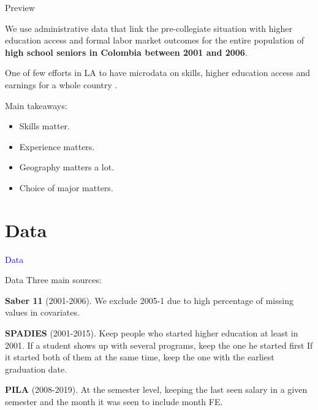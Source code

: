 \documentclass[11pt, aspectratio=169]{beamer}
\newenvironment{transitionframe}{
  \setbeamercolor{background canvas}{bg=gray}
  \begin{frame}}{
    \end{frame}
}
\newenvironment{wideitemize}{\itemize\addtolength{\itemsep}{10pt}}{\enditemize}
\begin{document}
\begin{frame}{Preview}
    \begin{wideitemize}
        \item We use administrative data that link the pre-collegiate situation with higher education access and formal labor market outcomes for the entire population of \textbf{high school seniors in Colombia between 2001 and 2006}.
        \item One of few efforts in LA to have microdata on skills, higher education access and earnings for a whole country \citep{gomez2022returns,herrera2020economic,ferreyra2022labor}.
        \item Main takeaways:
        \begin{itemize}
            \item Skills matter.
            \item Experience matters.
            \item Geography matters a lot.
            \item Choice of major matters. 
        \end{itemize}
    \end{wideitemize}

\end{frame}


\section{Data}

\begin{transitionframe}
  \begin{center}
    { \huge \textcolor{blue}{Data}}
  \end{center}
\end{transitionframe}

\begin{frame}{Data}
    Three main sources:
    \vspace{0.2cm}
    \begin{wideitemize}
        \item \textbf{Saber 11} (2001-2006). We exclude 2005-1 due to high percentage of missing values in covariates.
        \item \textbf{SPADIES} (2001-2015). Keep people who started higher education at least in 2001. If a student shows up with several programs, keep the one he started first If it started both of them at the same time, keep the one with the earliest graduation date.
        \item \textbf{PILA} (2008-2019). At the semester level, keeping the last seen salary in a given semester and the month it was seen to include month FE.

    \end{wideitemize}

\end{frame}
\end{document}

